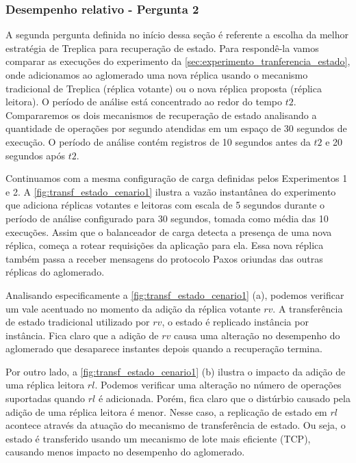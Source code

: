 \subsubsection{Desempenho relativo - Pergunta 2}

A segunda pergunta definida no início dessa seção é referente a escolha da melhor
estratégia de Treplica para recuperação de estado. Para respondê-la vamos comparar as
execuções do experimento da \autoref{sec:experimento_tranferencia_estado}, onde
adicionamos ao aglomerado uma nova réplica usando o mecanismo tradicional de Treplica
(réplica votante) ou o nova réplica proposta (réplica leitora). O período de análise está
concentrado ao redor do tempo $t2$. Compararemos os dois mecanismos de recuperação de
estado analisando a quantidade de operações por segundo atendidas em um espaço de 30
segundos de execução. O período de análise contém registros de 10 segundos antes da $t2$ e
20 segundos após $t2$.

Continuamos com a mesma configuração de carga definidas pelos Experimentos 1 e 2. A
\autoref{fig:transf_estado_cenario1} ilustra a vazão instantânea do experimento que
adiciona réplicas votantes e leitoras com escala de 5 segundos durante o período de
análise configurado para 30 segundos, tomada como média das 10 execuções. Assim que o
balanceador de carga detecta a presença de uma nova réplica, começa a rotear requisições
da aplicação para ela. Essa nova réplica também passa a receber mensagens do protocolo
Paxos oriundas das outras réplicas do aglomerado.

Analisando especificamente a \autoref{fig:transf_estado_cenario1} (a), podemos verificar
um vale acentuado no momento da adição da réplica votante $rv$. A transferência de estado
tradicional utilizado por $rv$, o estado é replicado instância por instância. Fica claro
que a adição de $rv$ causa uma alteração no desempenho do aglomerado que desaparece
instantes depois quando a recuperação termina.

Por outro lado, a \autoref{fig:transf_estado_cenario1} (b) ilustra o impacto da adição de
uma réplica leitora $rl$. Podemos verificar uma alteração no número de operações
suportadas quando $rl$ é adicionada. Porém, fica claro que o distúrbio causado pela
adição de uma réplica leitora é menor. Nesse caso, a replicação de estado em $rl$ acontece
através da atuação do mecanismo de transferência de estado. Ou seja, o estado é
transferido usando um mecanismo de lote mais eficiente (TCP), causando menos impacto no
desempenho do aglomerado.

